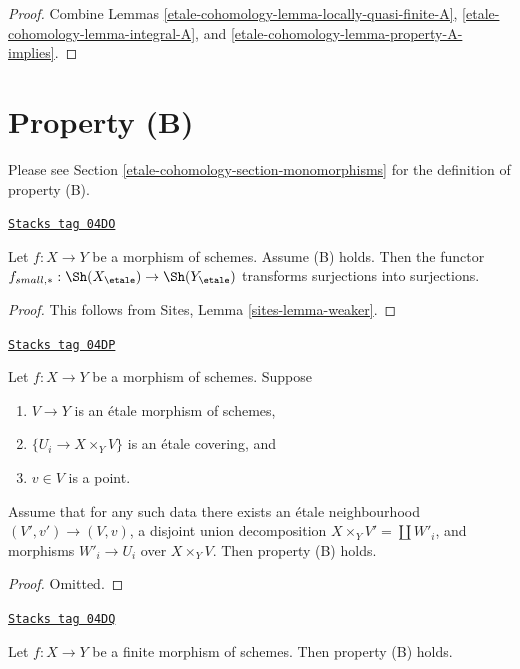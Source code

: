 \begin{proof}
Combine
Lemmas \ref{etale-cohomology-lemma-locally-quasi-finite-A},
\ref{etale-cohomology-lemma-integral-A}, and
\ref{etale-cohomology-lemma-property-A-implies}.
\end{proof}

\section{Property (B)}
\label{etale-cohomology-section-B}
Please see Section \ref{etale-cohomology-section-monomorphisms} for the definition of property
(B).

\begin{lemma}
\label{etale-cohomology-lemma-property-B-implies}
\href{https://stacks.math.columbia.edu/tag/04DO}{\texttt{Stacks tag 04DO}}

Let $f : X \to Y$ be a morphism of schemes. Assume (B) holds.
Then the functor
$f_{small, *} :
\Sh(X_\etale)
\to
\Sh(Y_\etale)$
transforms surjections into surjections.
\end{lemma}

\begin{proof}
This follows from
Sites, Lemma \ref{sites-lemma-weaker}.
\end{proof}

\begin{lemma}[Simplify B]
\label{etale-cohomology-lemma-simplify-B}
\href{https://stacks.math.columbia.edu/tag/04DP}{\texttt{Stacks tag 04DP}}

Let $f : X \to Y$ be a morphism of schemes. Suppose
\begin{enumerate}
\item $V \to Y$ is an \'etale morphism of schemes,
\item $\{U_i \to X \times_Y V\}$ is an \'etale covering, and
\item $v \in V$ is a point.
\end{enumerate}
Assume that for any such data there exists an \'etale neighbourhood
$(V', v') \to (V, v)$, a disjoint union decomposition
$X \times_Y V' = \coprod W'_i$, and morphisms $W'_i \to U_i$
over $X \times_Y V$. Then property (B) holds.
\end{lemma}

\begin{proof}
Omitted.
\end{proof}

\begin{lemma}[Finite B]
\label{etale-cohomology-lemma-finite-B}
\href{https://stacks.math.columbia.edu/tag/04DQ}{\texttt{Stacks tag 04DQ}}

Let $f : X \to Y$ be a finite morphism of schemes.
Then property (B) holds.
\end{lemma}

